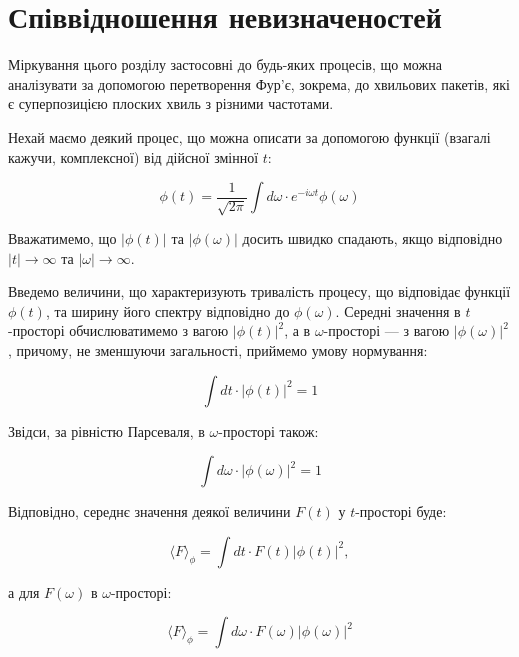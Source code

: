 \section{Співвідношення невизначеностей}

Міркування цього розділу застосовні до будь-яких процесів, що можна аналізувати за допомогою перетворення Фур’є, зокрема, до хвильових пакетів, які є
суперпозицією плоских хвиль з різними частотами.

Нехай маємо деякий процес, що можна описати за допомогою функції (взагалі кажучи, комплексної) від дійсної змінної \( t \):

\begin{equation*}
\phi(t) = \frac{1}{\sqrt{2\pi}} \int d\omega \cdot e^{-i\omega t} \phi(\omega)
\end{equation*}

Вважатимемо, що \( |\phi(t)| \) та \( |\phi(\omega)| \) досить швидко спадають, якщо відповідно \( |t| \to \infty \) та \( |\omega| \to \infty \).

Введемо величини, що характеризують тривалість процесу, що відповідає функції \( \phi(t) \), та ширину його спектру відповідно до \( \phi(\omega) \).
Середні значення в \( t \)-просторі обчислюватимемо з вагою \( |\phi(t)|^2 \), а в \( \omega \)-просторі --- з вагою \( |\phi(\omega)|^2 \), причому, не
зменшуючи загальності, приймемо умову нормування:

\begin{equation*}
\int dt \cdot |\phi(t)|^2 = 1
\end{equation*}

Звідси, за рівністю Парсеваля, в \( \omega \)-просторі також:

\begin{equation*}
\int d\omega \cdot |\phi(\omega)|^2 = 1
\end{equation*}

Відповідно, середнє значення деякої величини \( F(t) \) у \( t \)-просторі буде:

\begin{equation*}
\langle F \rangle_{\phi} = \int dt \cdot F(t) |\phi(t)|^2,
\end{equation*}

а для \( F(\omega) \) в \( \omega \)-просторі:

\begin{equation*}
\langle F \rangle_{\phi} = \int d\omega \cdot F(\omega) |\phi(\omega)|^2
\end{equation*}

